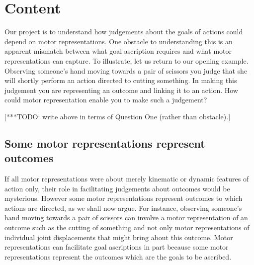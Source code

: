 \documentclass[12pt,\papersize]{extarticle}
\begin{document}
\section{Content}
\label{sec:content}

Our project is to understand how judgements about the goals of actions  could depend on motor representations.  One obstacle to understanding this is an apparent mismatch between what goal ascription requires and what motor representations can capture. To illustrate, let us return to our opening example. Observing someone's hand moving towards a pair of scissors you judge that she will shortly perform an action directed to cutting something.  In making this judgement you are representing an outcome and linking it to an action. How could motor representation enable you to make such a judgement?

[***TODO: write above in terms of Question One (rather than obstacle).]

\subsection{Some motor representations represent outcomes}
If all motor representations were about merely kinematic or dynamic features of action only, their role in facilitating judgements about outcomes would be mysterious. However some motor representations represent outcomes to which actions are directed, as we shall now argue.  For instance, observing someone's hand moving towards a pair of scissors can involve a motor representation of an outcome such as the cutting of something and not only motor representations of individual joint displacements that might bring about this outcome.  Motor representations can facilitate goal ascriptions in part because some motor representations represent the outcomes which are the goals to be ascribed.  
\end{document}
